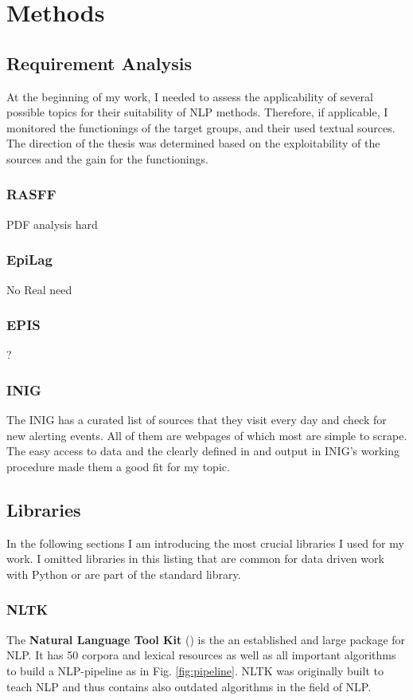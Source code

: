 \chapter{Methods}

\section{Requirement Analysis}
At the beginning of my work, I needed to assess the applicability of several possible topics for their suitability of NLP methods.
Therefore, if applicable, I monitored the functionings of the target groups, and their used textual sources.
The direction of the thesis was determined based on the exploitability of the sources and the gain for the functionings.
\subsection{RASFF}
PDF analysis hard
\subsection{EpiLag}
No Real need
\subsection{EPIS}
?
\subsection{INIG}\label{INIGsources}
The INIG has a curated list of sources that they visit every day and check for new alerting events.
All of them are webpages of which most are simple to scrape.
The easy access to data and the clearly defined in and output in INIG's working procedure made them a good fit for my topic.

\section{Libraries}
In the following sections I am introducing the most crucial libraries I used for my work.
I omitted libraries in this listing that are common for data driven work with Python or are part of the standard library.
\subsection{NLTK}
The \textbf{Natural Language Tool Kit} () is the an established and large package for NLP.
It has 50 corpora and lexical resources as well as all important algorithms to build a NLP-pipeline as in Fig. \ref{fig:pipeline}.
NLTK was originally built to teach NLP and thus contains also outdated algorithms in the field of NLP.

